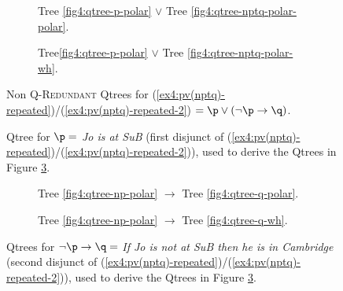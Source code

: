 \begin{figure}[H]
	\centering
	\begin{subfigure}[b]{.45\linewidth}
		\centering
		\caption[]{Tree \ref{fig4:qtree-p-polar} $\vee$ Tree \ref{fig4:qtree-nptq-polar-polar}.}\label{fig4:qtree-pv(nptq)-polar-polar-repeated}
	\end{subfigure}\hfill
	\begin{subfigure}[b]{.45\linewidth}
		\centering
		\scalebox{1}{
			\begin{forest}
				[CS [{\fbox{$\p$}}][{$\neg \p$} [\fbox{$\q$}][$\r$][...]]]
			\end{forest}
		}
		\caption[]{Tree\ref{fig4:qtree-p-polar} $\vee$ Tree  \ref{fig4:qtree-nptq-polar-wh}.}\label{fig4:qtree-pv(nptq)-polar-wh-repeated}
	\end{subfigure}
	\caption[]{Non \textsc{Q-Redundant} Qtrees for (\ref{ex4:pv(nptq)-repeated})/(\ref{ex4:pv(nptq)-repeated-2}) $= \p \vee (\neg \p \rightarrow \q)$.}\label{fig4:qtrees-pv(nptq)-non-redundant}
\end{figure}

\begin{figure}[H]\setlength{\fboxsep}{2pt}
	\centering
		\scalebox{1}{
			\begin{forest}
				[CS [\fbox{\p}] [$\neg \p$]]
			\end{forest}
		}
	\caption[]{Qtree for $\p =$ \textit{Jo is at SuB} (first disjunct of (\ref{ex4:pv(nptq)-repeated})/(\ref{ex4:pv(nptq)-repeated-2})), used to derive the Qtrees in Figure \ref{fig4:qtrees-pv(nptq)-non-redundant}.}
	\label{fig4:qtrees-p-1st-disj}
\end{figure}


\begin{figure}[H]\setlength{\fboxsep}{2pt}
	\centering
	\begin{subfigure}[b]{.45\linewidth}
		\centering
		\caption[]{Tree \ref{fig4:qtree-np-polar} $\rightarrow$ Tree \ref{fig4:qtree-q-polar}.}
	\end{subfigure}\hfill
	\begin{subfigure}[b]{.45\linewidth}
		\centering
		\caption[]{Tree \ref{fig4:qtree-np-polar} $\rightarrow$ Tree \ref{fig4:qtree-q-wh}.}
	\end{subfigure}
	\caption[]{Qtrees for $\neg \p \rightarrow\q =$ \textit{If Jo is not at SuB then he is in Cambridge} (second disjunct of (\ref{ex4:pv(nptq)-repeated})/(\ref{ex4:pv(nptq)-repeated-2})), used to derive the Qtrees in Figure \ref{fig4:qtrees-pv(nptq)-non-redundant}.}
	\label{fig4:qtrees-nptq-2nd-disj}
\end{figure}

